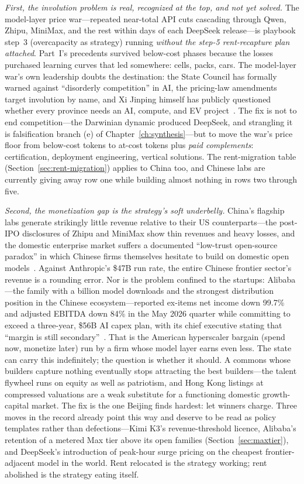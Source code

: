 \emph{First, the involution problem is real, recognized at the top, and not yet solved.} The model-layer price war---repeated near-total API cuts cascading through Qwen, Zhipu, MiniMax, and the rest within days of each DeepSeek release---is playbook step~3 (overcapacity as strategy) running \emph{without the step-5 rent-recapture plan attached}. Part~I's precedents survived below-cost phases because the losses purchased learning curves that led somewhere: cells, packs, cars. The model-layer war's own leadership doubts the destination: the State Council has formally warned against ``disorderly competition'' in AI, the pricing-law amendments target involution by name, and Xi Jinping himself has publicly questioned whether every province needs an AI, compute, and EV project~\cite{china-involution}. The fix is not to end competition---the Darwinian dynamic produced DeepSeek, and strangling it is falsification branch (e) of Chapter~\ref{ch:synthesis}---but to move the war's price floor from below-cost tokens to at-cost tokens plus \emph{paid complements}: certification, deployment engineering, vertical solutions. The rent-migration table (Section~\ref{sec:rent-migration}) applies to China too, and Chinese labs are currently giving away row one while building almost nothing in rows two through five.

\emph{Second, the monetization gap is the strategy's soft underbelly.} China's flagship labs generate strikingly little revenue relative to their US counterparts---the post-IPO disclosures of Zhipu and MiniMax show thin revenues and heavy losses, and the domestic enterprise market suffers a documented ``low-trust open-source paradox'' in which Chinese firms themselves hesitate to build on domestic open models~\cite{china-monetization}. Against Anthropic's \$47B run rate, the entire Chinese frontier sector's revenue is a rounding error. Nor is the problem confined to the startups: Alibaba---the family with a billion model downloads and the strongest distribution position in the Chinese ecosystem---reported ex-items net income down 99.7\% and adjusted EBITDA down 84\% in the May 2026 quarter while committing to exceed a three-year, \$56B AI capex plan, with its chief executive stating that ``margin is still secondary''~\cite{alibaba-capex}. That is the American hyperscaler bargain (spend now, monetize later) run by a firm whose model layer earns even less. The state can carry this indefinitely; the question is whether it should. A commons whose builders capture nothing eventually stops attracting the best builders---the talent flywheel runs on equity as well as patriotism, and Hong Kong listings at compressed valuations are a weak substitute for a functioning domestic growth-capital market. The fix is the one Beijing finds hardest: let winners charge. Three moves in the record already point this way and deserve to be read as policy templates rather than defections---Kimi K3's revenue-threshold licence, Alibaba's retention of a metered Max tier above its open families (Section~\ref{sec:maxtier}), and DeepSeek's introduction of peak-hour surge pricing on the cheapest frontier-adjacent model in the world. Rent relocated is the strategy working; rent abolished is the strategy eating itself.

